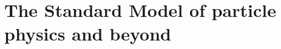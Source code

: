 


\loremipsum


\loremipsum

\dominitoc
\tableofcontents

\newpage

\setcounter{page}{1}


\loremipsum

%
%
%
%
%
%
%

\setcounter{mtc}{3}
\chapter{The Standard Model of particle physics and beyond}
\minitoc
\newpage

